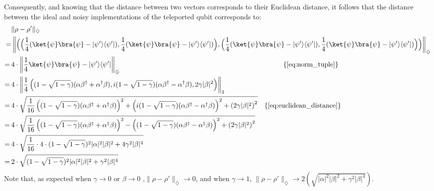   Consequently, and knowing that the distance between two vectors corresponds to their Euclidean distance, it follows that the distance between the ideal and noisy implementations of the teleported qubit corresponds to:
\begin{equation}
  \begin{split}
  & \lVert \rho-\rho' \rVert_{\diamondsuit} \\
  =&  \left\lVert \Big(\Big(\frac{1}{4} ( \ket{\psi}\bra{\psi} -|\psi'\rangle \langle \psi'|), \frac{1}{4} ( \ket{\psi}\bra{\psi} -|\psi'\rangle \langle \psi'|)\Big),\Big(\frac{1}{4} ( \ket{\psi}\bra{\psi} -|\psi'\rangle \langle \psi'|), \frac{1}{4}  ( \ket{\psi}\bra{\psi} -|\psi'\rangle \langle \psi'| )\Big)\Big)\right\rVert_{\diamondsuit} \\
   = \hspace{2pt}&  4 \cdot \left\lVert \frac{1}{4} \ket{\psi}\bra{\psi} -|\psi'\rangle \langle \psi'|  \right\rVert_{\diamondsuit}  \hspace{237pt} \{\text{\autoref{eq:norm_tuple}}\} \\
   = \hspace{2pt}&  4 \cdot \left\lVert \frac{1}{4} \left((1-\sqrt{1-\gamma}) (\alpha \beta^{\dag}  + \alpha^{\dag} \beta) ,i(1-\sqrt{1-\gamma}) (\alpha \beta^{\dag} - \alpha^{\dag} \beta),2\gamma |\beta|^{2}\right)  \right\rVert_{2} \\
   = \hspace{2pt}&  4 \cdot \sqrt{ \frac{1}{16} \left( (1-\sqrt{1-\gamma}) (\alpha \beta^{\dag}  + \alpha^{\dag} \beta)\right)^{2} + \left(i(1-\sqrt{1-\gamma}) (\alpha \beta^{\dag} - \alpha^{\dag} \beta)\right)^{2} + \left(2\gamma |\beta|^{2}\right)^{2}} \hspace{10pt} \{\text{\autoref{eq:euclidean_distance}}\}\\
   = \hspace{2pt}&  4 \cdot \sqrt{ \frac{1}{16} \left( (1-\sqrt{1-\gamma}) (\alpha \beta^{\dag}  + \alpha^{\dag} \beta)\right)^{2}  - \left((1-\sqrt{1-\gamma}) (\alpha \beta^{\dag} - \alpha^{\dag} \beta)\right)^{2} + \left(2\gamma |\beta|^{2}\right)^{2}} \\
   = \hspace{2pt}&  4 \cdot \sqrt{ \frac{1}{16} \cdot 4 \cdot  (1-\sqrt{1-\gamma})^{2} |\alpha|^{2}|\beta|^{2} + 4 \gamma^{2} |\beta|^{4}} \\
   = \hspace{2pt}&  2 \cdot \sqrt{  (1-\sqrt{1-\gamma})^{2} |\alpha|^{2}|\beta|^{2} + \gamma^{2} |\beta|^{4}} \\
\end{split}
\end{equation}
Note that, as expected when $\gamma \xrightarrow{}0$ or $\beta \xrightarrow{}0$ ,$\lVert \rho-\rho' \rVert_{\diamondsuit}\xrightarrow{}0$, and when $\gamma \xrightarrow{}1$, $\lVert \rho-\rho' \rVert_{\diamondsuit}\xrightarrow{} 2 \left(\sqrt{|\alpha|^{2}|\beta|^{2} + \gamma^{2} |\beta|^{4}}\right)$.

